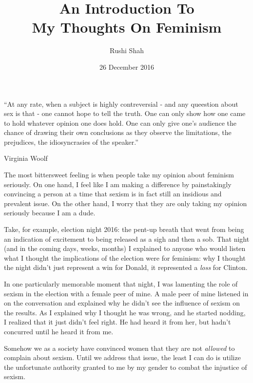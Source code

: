\documentclass{article}
\author{Rushi Shah}
\date{26 December 2016}
\title{An Introduction To \\ My Thoughts On Feminism}
\begin{document}
\maketitle

	\epigraph{``At any rate, when a subject is highly contreversial - and any queestion about sex is that - one cannot hope to tell the truth. One can only show how one came to hold whatever opinion one does hold. One can only give one's audience the chance of drawing their own conclusions as they observe the limitations, the prejudices, the idiosyncrasies of the speaker.''}{Virginia Woolf}

	The most bittersweet feeling is when people take my opinion about feminism seriously. On one hand, I feel like I am making a difference by painstakingly convincing a person at a time that sexism is in fact still an insidious and prevalent issue. On the other hand, I worry that they are only taking my opinion seriously because I am a dude. 

	Take, for example, election night 2016: the pent-up breath that went from being an indication of excitement to being released as a sigh and then a sob. That night (and in the coming days, weeks, months) I explained to anyone who would listen what I thought the implications of the election were for feminism: why I thought the night didn't just represent a win for Donald, it represented a \textit{loss} for Clinton. 


	In one particularly memorable moment that night, I was lamenting the role of sexism in the election with a female peer of mine. A male peer of mine listened in on the conversation and explained why he didn't see the influence of sexism on the results. As I explained why I thought he was wrong, and he started nodding, I realized that it just didn't feel right. He had heard it from her, but hadn't concurred until he heard it from me. 

	Somehow we as a society have convinced women that they are not \textit{allowed} to complain about sexism. Until we address that issue, the least I can do is utilize the unfortunate authority granted to me by my gender to combat the injustice of sexism. 


\end{document}
